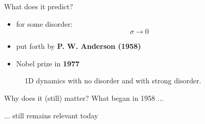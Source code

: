 \documentclass[1pt]{beamer}
\begin{document}
\begin{frame}{What does it predict?}
\begin{minipage}[c]{0.33\textwidth}
\begin{itemize}
\item for some disorder:
$$ \sigma \rightarrow 0$$
\vspace{5mm}
\item put forth by \textbf{P. W. Anderson (1958)}
\vspace{15mm}
\item Nobel prize in \textbf{1977}
\end{itemize}\hfill
\end{minipage}
\begin{minipage}[c]{0.64\textwidth}
\begin{figure}
\caption{1D dynamics with no disorder and with strong disorder.}
\end{figure}
\end{minipage}
\end{frame}

\begin{frame}{Why does it (still) matter?}
What began in 1958 ...
\begin{figure}
\end{figure}
... still remains relevant today
\begin{figure}
\end{figure}
\end{frame}
\end{document}
